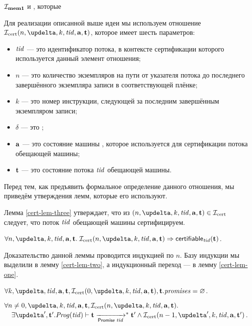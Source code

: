 $\mathcal{I}_{\rm \bf mem1}$ и , которые 


Для реализации описанной выше идеи мы используем отношение
$\invCert(n, \delta, k, \tId, \aT, \tT)$, которое имеет шесть параметров:
\begin{itemize}
  \item $\mathit{tid}$ --- это идентификатор потока, в контексте сертификации которого используется данный элемент отношения;
  \item $n$ --- это количество экземпляров на пути от указателя потока до последнего завершённого экземпляра записи в
    соответствующей плёнке;
  \item $k$ --- это номер инструкции, следующей за последним завершённым экземпляром записи;
  \item $\delta$ --- это ;
  \item $\mathbf{a}$ --- это состояние машины \ARMt, которое используется для сертификации потока обещающей машины;
  \item $\mathbf{t}$ --- это состояние потока $\mathit{tid}$ обещающей машины.
\end{itemize}
Перед тем, как предъявить формальное определение данного отношения, мы приведём утверждения лемм, которые
его используют.

Лемма \ref{cert-lem-three} утверждает, что из $(n, \delta, k, \tId, \aT, \tT) \in \invCert$ следует,
что поток $\mathit{tid}$ обещающей машины сертифицируем.
\begin{lemma}
\label{cert-lem-three}
$\forall n, \delta, k, \tId, \aT, \tT. \; \invCert(n, \delta, k, \tId, \aT, \tT) \Rightarrow \certifiableTid(\tT)$.
\end{lemma}
Доказательство данной леммы проводится индукцией по $n$.
Базу индукции мы выделили в лемму \ref{cert-lem-two}, а индукционный переход --- в лемму \ref{cert-lem-one}.

\begin{lemma}
\label{cert-lem-two}
$\forall k, \delta, \tId, \aT, \tT, \invCert(0, \delta, k, \tId, \aT, \tT), \tT.\PromSet = \emptyset$.
\end{lemma}

\begin{lemma}
\label{cert-lem-one}
$\forall n \not = 0, \delta, k, \tId, \aT, \tT, \invCert(n, \delta, k, \tId, \aT, \tT).$ \\
${} \quad \exists \delta', \tT'. \Cfprom(\tId) \vdash \tT \promTStep^{*} \tT' \land \invCert(n - 1, \delta', k, \tId, \aT, \tT')$.
\end{lemma}

